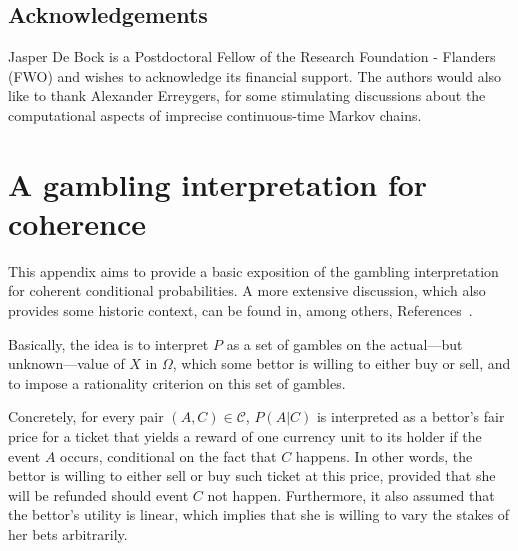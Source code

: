 \documentclass[10pt,a4paper]{paper}
\theoremstyle{definition}
\begin{document}


\subsection*{Acknowledgements}

Jasper De Bock is a Postdoctoral Fellow of the Research Foundation - Flanders (FWO) and wishes to acknowledge its financial support. The authors would also like to thank Alexander Erreygers, for some stimulating discussions about the computational aspects of imprecise continuous-time Markov chains.

 


\appendix


\section{A gambling interpretation for coherence}\label{app:coherence}

This appendix aims to provide a basic exposition of the gambling interpretation for coherent conditional probabilities. A more extensive discussion, which also provides some historic context, can be found in, among others, References~\cite{regazzini1985finitely,williams1975,Williams:2007eu, Vicig:2007gs,berti1991coherent, berti2002coherent}.

Basically, the idea is to interpret $P$ as a set of gambles on the actual---but unknown---value of $X$ in $\Omega$, which some bettor is willing to either buy or sell, and to impose a rationality criterion on this set of gambles.

Concretely, for every pair $(A,C)\in\mathcal{C}$, $P(A\vert C)$ is interpreted as a bettor's fair price for a ticket that yields a reward of one currency unit to its holder if the event $A$ occurs, conditional on the fact that $C$ happens. In other words, the bettor is willing to either sell or buy such ticket at this price, provided that she will be refunded should event $C$ not happen. Furthermore, it also assumed that the bettor's utility is linear, which implies that she is willing to vary the stakes of her bets arbitrarily.
\end{document}
